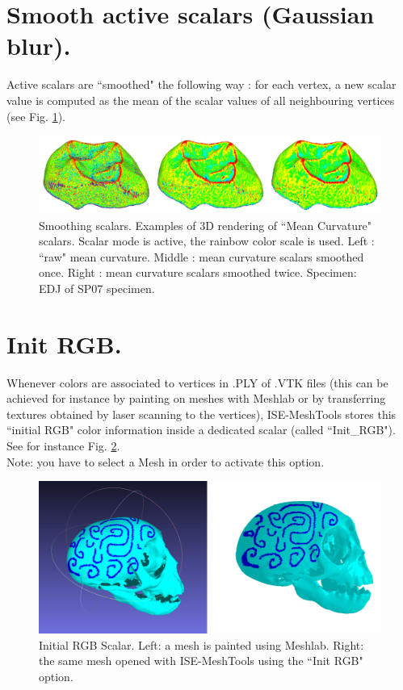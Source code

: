 \section{Smooth active scalars (Gaussian blur).}
Active scalars are ``smoothed" the following way : for each vertex, a new scalar value is computed as
the mean of the scalar values of all neighbouring vertices (see Fig. \ref{smoothing_scalars}).
\begin{figure}
  \centering
  \includegraphics[scale=0.25]{images/Scalars_renreding/Smooth_012.png} 
	\caption{Smoothing scalars. Examples of 3D rendering of ``Mean Curvature" scalars. Scalar mode is active, the rainbow color scale is used. Left : ``raw" mean curvature. Middle : mean curvature scalars smoothed once. Right : mean curvature scalars smoothed twice. Specimen: EDJ of SP07 specimen.}
\label{smoothing_scalars}
 
\end{figure}


\section{Init RGB.}
Whenever colors are associated to vertices in .PLY of .VTK files (this can be achieved for instance by painting on meshes with Meshlab or by transferring textures obtained by laser scanning to the vertices), ISE-MeshTools stores this ``initial RGB" color information inside a dedicated scalar (called ``Init\_RGB"). See for instance Fig. \ref{rgb_scalar}.
\\Note: you have to select a Mesh in order to activate this option.

\begin{figure}
  \centering
  \includegraphics[scale=0.3]{images/Scalars_renreding/init_rgb.png} 
	\caption{Initial RGB Scalar. Left: a mesh is painted using Meshlab. Right: the same mesh opened with ISE-MeshTools using the ``Init RGB" option.}
\label{rgb_scalar}
 
\end{figure}

